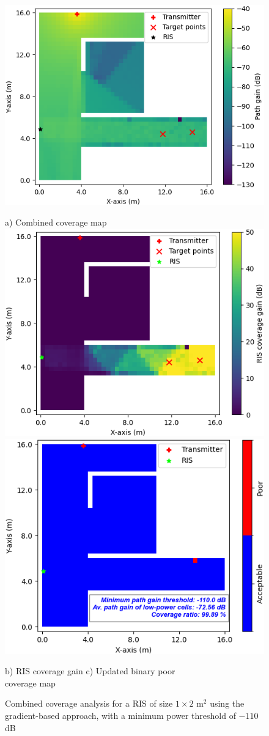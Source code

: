 \documentclass{IEEEoj}
\begin{document}
\begin{figure}
	\centering
	\includegraphics[width=0.8\linewidth]{Sim_Results/Comb_cov_1x2_Gradient_-110dB.png}
	
	a) Combined coverage map \\[5pt]
	
	\includegraphics[width=0.49\linewidth]{Sim_Results/RIS_cov_gain_1x2_Gradient_-110dB.png}
	\hfill
	\includegraphics[width=0.48\linewidth]{Sim_Results/New_Binary_Cov_Map_1x2_Gradient_-110dB.png}
	
	\hspace{10pt} b) RIS coverage gain \hspace{30pt} c) Updated binary poor \\ \hspace{140pt} coverage map
	\caption{Combined coverage analysis for a RIS of size $1 \times 2$ m$^2$ using the gradient-based approach, with a minimum power threshold of $-110$ dB}
	\label{comb_cov_gradient_-110dB}
\end{figure}
\end{document}
